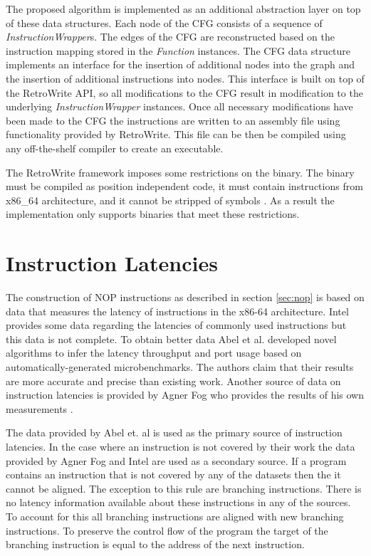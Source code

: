 The proposed algorithm is implemented as an additional abstraction layer on top of these data structures. 
Each node of the CFG consists of a sequence of \textit{InstructionWrapper}s. 
The edges of the CFG are reconstructed based on the instruction mapping stored in the \textit{Function} instances. 
The CFG data structure implements  an interface for the insertion of additional nodes into the graph and the insertion of additional instructions into nodes. 
This interface is built on top of the RetroWrite API, so all modifications to the CFG result in modification to the underlying \textit{InstructionWrapper} instances. 
Once all necessary modifications have been made to the CFG the instructions are written to an assembly file using functionality provided by RetroWrite. 
This file can be then be compiled using any off-the-shelf compiler to create an executable. 

The RetroWrite framework imposes some restrictions on the binary. The binary must be compiled as position independent code, it must contain instructions from x86\_64 architecture, and 
it cannot be stripped of symbols \cite{hexhive}. 
As a result the implementation only supports binaries that meet these restrictions. 


\section{Instruction Latencies}
The construction of NOP instructions as described in section \ref{sec:nop} is based on data that measures the latency of instructions in the x86-64 architecture.
Intel provides some data regarding the latencies of commonly used instructions \cite{intel-ref-manual} but this data is not complete.
To obtain better data Abel et al.  \cite{uops} developed novel algorithms to infer the latency throughput and port usage based on automatically-generated microbenchmarks. 
The authors claim that their results are more accurate and precise than existing work. 
Another source of data on instruction latencies is provided by Agner Fog who provides the results of his own measurements \cite{fog_2021}. 

The data provided by Abel et. al is  used as the primary source of instruction latencies. In the case where an instruction is not covered by their work the data 
provided by Agner Fog and Intel are used as a secondary source. If a program contains an instruction that is not covered by any of the datasets then the it cannot
be aligned. The exception to this rule are branching instructions. There is no latency information available about these instructions in any of the sources. 
To account for this  all branching instructions are aligned with new branching instructions. To preserve the control flow of the program the target of 
the branching instruction is equal to the address of the next instruction. 
